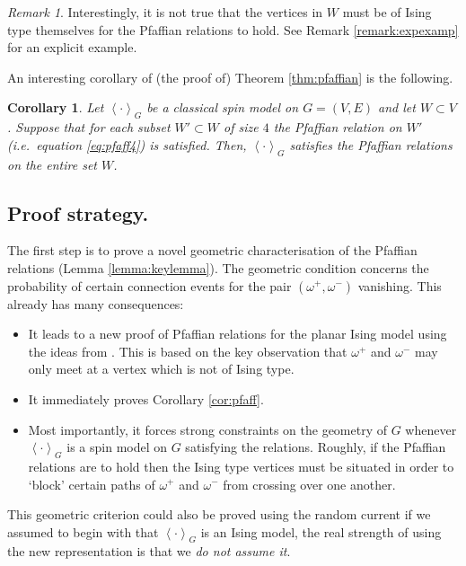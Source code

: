 \documentclass{article}
\newtheorem{corollary}[theorem]{Corollary}
\numberwithin{equation}{section}
\theoremstyle{definition}
\theoremstyle{definition}
\theoremstyle{remark}
\newtheorem{remark}{Remark}
\newcommand{\w}{\omega}
\begin{document}
\begin{remark}
 Interestingly, it is not true that the vertices in $W$ must be of Ising type themselves for the Pfaffian relations to hold. See Remark \ref{remark:expexamp} for an explicit example.
\end{remark}

An interesting corollary of (the proof of) Theorem \ref{thm:pfaffian} is the following.
\begin{corollary}\label{cor:thm1}
	Let $\left< \cdot \right>_{G}$ be a classical spin model on $G = (V,E)$ and let $W \subset V$. Suppose that for each subset $W' \subset W$ of size $4$ the Pfaffian relation on $W'$ (i.e.~equation \eqref{eq:pfaff4}) is satisfied. Then, $\left< \cdot \right>_{G}$ satisfies the Pfaffian relations on the entire set $W$.
\end{corollary}
\subsection{Proof strategy. }The first step is to prove a novel geometric characterisation of the Pfaffian relations (Lemma \ref{lemma:keylemma}). The geometric condition concerns the probability of certain connection events for the pair $(\w^+,\w^-)$ vanishing. This already has many consequences:
\begin{itemize}
	\item It leads to a new proof of Pfaffian relations for the planar Ising model using the ideas from \cites{Lis22a}. This is based on the key observation that $\w^+$ and $\w^-$ may only meet at a vertex which is not of Ising type.
	\item It immediately proves Corollary \ref{cor:pfaff}.
	\item Most importantly, it forces strong constraints on the geometry of $G$ whenever $\left< \cdot \right>_{G}$ is a spin model on $G$ satisfying the relations. 
Roughly, if the Pfaffian relations are to hold then the Ising type vertices must be situated in order to `block' certain paths of $\w^+$ and $\w^-$ from crossing over one another. 
\end{itemize}
This geometric criterion could also be proved using the random current if we assumed to begin with that $\left< \cdot \right>_{G}$ is an Ising model, the real strength of using the new representation is that we \emph{do not assume it}. 
\end{document}
